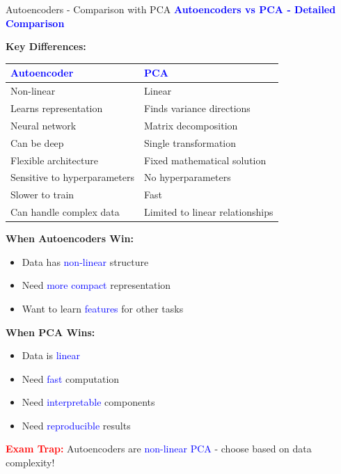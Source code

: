 \documentclass[8pt]{beamer}
\begin{document}
	\begin{frame}{Autoencoders - Comparison with PCA}
		\fontsize{6.5}{7.5}\selectfont
		\textcolor{blue}{\textbf{Autoencoders vs PCA - Detailed Comparison}}
		
		\textbf{Key Differences:}
		
		\begin{tabular}{|p{4cm}|p{4cm}|}
			\hline
			\textcolor{blue}{Autoencoder} & \textcolor{blue}{PCA} \\
			\hline
			Non-linear & Linear \\
			\hline
			Learns representation & Finds variance directions \\
			\hline
			Neural network & Matrix decomposition \\
			\hline
			Can be deep & Single transformation \\
			\hline
			Flexible architecture & Fixed mathematical solution \\
			\hline
			Sensitive to hyperparameters & No hyperparameters \\
			\hline
			Slower to train & Fast \\
			\hline
			Can handle complex data & Limited to linear relationships \\
			\hline
		\end{tabular}
		
		\textbf{When Autoencoders Win:}
		\begin{itemize}
			\item Data has \textcolor{blue}{non-linear} structure
			\item Need \textcolor{blue}{more compact} representation
			\item Want to learn \textcolor{blue}{features} for other tasks
		\end{itemize}
		
		\textbf{When PCA Wins:}
		\begin{itemize}
			\item Data is \textcolor{blue}{linear}
			\item Need \textcolor{blue}{fast} computation
			\item Need \textcolor{blue}{interpretable} components
			\item Need \textcolor{blue}{reproducible} results
		\end{itemize}
		
		\textcolor{red}{\textbf{Exam Trap:}} Autoencoders are \textcolor{blue}{non-linear PCA} - choose based on data complexity!
	\end{frame}
	
\end{document}
